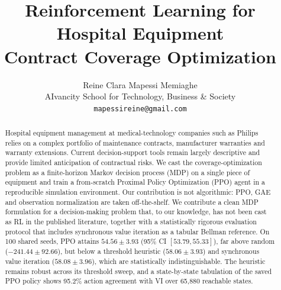 \documentclass{article}
\title{Reinforcement Learning for Hospital Equipment\\
       Contract Coverage Optimization}
\author{%
  Reine Clara Mapessi Memiaghe \\
  AIvancity School for Technology, Business \& Society \\
  \texttt{mapessireine@gmail.com}
}
\begin{document}
\maketitle

\begin{abstract}
Hospital equipment management at medical-technology companies such as Philips relies on a complex portfolio of maintenance contracts, manufacturer warranties and warranty extensions. Current decision-support tools remain largely descriptive and provide limited anticipation of contractual risks. We cast the coverage-optimization problem as a finite-horizon Markov decision process (MDP) on a single piece of equipment and train a from-scratch Proximal Policy Optimization (PPO) agent in a reproducible simulation environment. Our contribution is not algorithmic: PPO, GAE and observation normalization are taken off-the-shelf. We contribute a clean MDP formulation for a decision-making problem that, to our knowledge, has not been cast as RL in the published literature, together with a statistically rigorous evaluation protocol that includes synchronous value iteration as a tabular Bellman reference. On 100 shared seeds, PPO attains $54.56 \pm 3.93$ (95\% CI $[53.79, 55.33]$), far above random ($-241.44 \pm 92.66$), but below a threshold heuristic ($58.06 \pm 3.93$) and synchronous value iteration ($58.08 \pm 3.96$), which are statistically indistinguishable. The heuristic remains robust across its threshold sweep, and a state-by-state tabulation of the saved PPO policy shows 95.2\% action agreement with VI over 65{,}880 reachable states.
\end{abstract}








{\small


}
\end{document}
